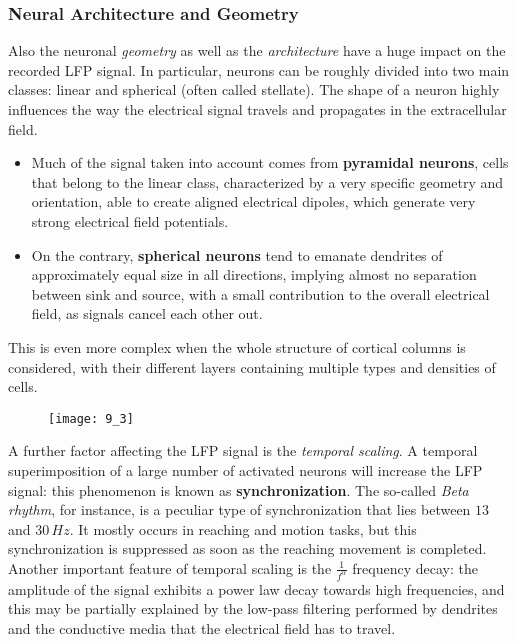\subsubsection{Neural Architecture and Geometry}
Also the neuronal \textit{geometry} as well as the \textit{architecture} have a huge impact on the
recorded LFP signal. In particular, neurons can be roughly divided into two main
classes: linear and spherical (often called stellate). The shape of a neuron highly
influences the way the electrical signal travels and propagates in the extracellular
field. 
\begin{itemize}
    \item Much of the signal taken into account comes from \textbf{pyramidal neurons}, cells that
    belong to the linear class, characterized by a very specific geometry and orientation, able to create 
    aligned electrical dipoles, which generate very strong electrical field potentials.
    \item On the contrary, \textbf{spherical neurons} tend to emanate dendrites of approximately equal 
    size in all directions, implying almost no separation between sink and source, with a small contribution 
    to the overall electrical field, as signals cancel each other out.
\end{itemize}
This is even more complex when the whole structure of cortical columns is considered, with their different layers 
containing multiple types and densities of cells.
\begin{figure}[H]
    \texttt{[image: 9\_3]}
    \centering
\end{figure}
A further factor affecting the LFP signal is the \textit{temporal scaling}. A temporal
superimposition of a large number of activated neurons will increase the LFP
signal: this phenomenon is known as \textbf{synchronization}. The so-called \textit{Beta rhythm},
for instance, is a peculiar type of synchronization that lies between \(13\) and \(30\,Hz\).
It mostly occurs in reaching and motion tasks, but this synchronization is suppressed as soon as the reaching movement is completed. 
Another important feature of temporal scaling is the \(\frac{1}{f^{\alpha}}\) frequency decay:
the amplitude of the signal exhibits a power law decay towards high frequencies, and this
may be partially explained by the low-pass filtering performed by dendrites and the conductive media that the electrical 
field has to travel.

